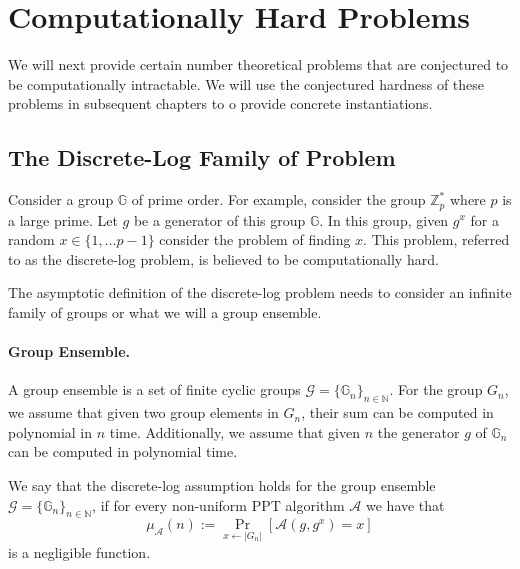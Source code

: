 \documentclass[12pt]{tufte-book}
\begin{document}
%

\section{Computationally  Hard Problems}\label{sec:assumptions}
We will next provide certain number theoretical problems that are conjectured to be computationally intractable. We will use the conjectured hardness of these problems in subsequent chapters to o provide concrete instantiations.

\subsection{The Discrete-Log Family of Problem}
Consider a group $\mathbb{G}$ of prime order. For example, consider the group $\mathbb{Z}_p^*$ where $p$ is a large prime. Let $g$ be a generator of this group $\mathbb{G}$. In this group, given $g^x$ for a random $x \in \{1,\ldots p-1\}$ consider the problem of finding $x$. This problem, referred to as the discrete-log problem, is believed to be computationally hard.

The asymptotic definition of the discrete-log problem needs to consider an infinite family of groups or what we will a group ensemble. 

\paragraph{Group Ensemble.} A group ensemble is a set of finite cyclic groups $\mathcal{G} =\{ \mathbb{G}_n\}_{n \in \mathbb{N}}$. For the group $G_n$, we assume that given two group elements in $G_n$, their sum can be computed in polynomial in $n$ time. Additionally, we assume that given $n$ the generator $g$ of $\mathbb{G}_n$ can be computed in polynomial time. 

\begin{definition}\label{def:dl}
We say that the discrete-log assumption holds for the group ensemble $\mathcal{G} =\{ \mathbb{G}_n\}_{n \in \mathbb{N}}$, if for every non-uniform PPT algorithm $\mathcal{A}$ we have that
\[\mu_\mathcal{A}(n) := \Pr_{x \leftarrow |G_n|}[\mathcal{A}(g,g^x) = x]\]
is a negligible function.
\end{definition}
\end{document}
